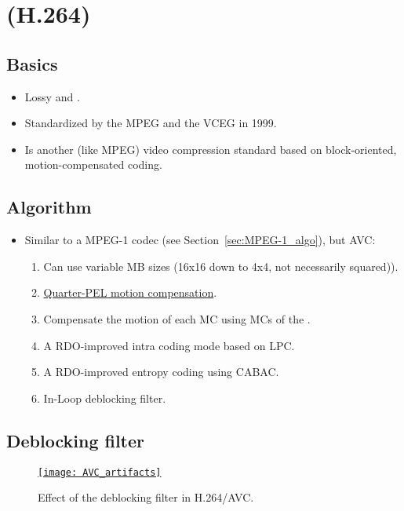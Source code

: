 \chapter{ (H.264)}

\section{Basics}
\begin{itemize}
\item Lossy and  \cite{wikipedia_AVC}.
\item Standardized by the \gls{MPEG} and the \gls{VCEG} in 1999.
\item Is another (like \gls{MPEG}) video compression standard based on
  block-oriented, motion-compensated coding.
\end{itemize}

\section{Algorithm}
\label{sec:MPEG-4_AVC_algo}
\begin{itemize}
\item Similar to a MPEG-1 codec (see Section~\ref{sec:MPEG-1_algo}),
  but \gls{AVC}:
\begin{enumerate}
\item Can use variable MB sizes (16x16 down to 4x4, not
  necessarily squared)).
\item
  \href{https://en.wikipedia.org/wiki/Motion_compensation}{Quarter-\gls{PEL}
    motion compensation}.
\item Compensate the motion of each MC using MCs of the
  .
\item A \gls{RDO}-improved intra coding mode based on \gls{LPC}.
\item A \gls{RDO}-improved entropy coding using \gls{CABAC}.
\item In-Loop deblocking filter.
\end{enumerate}
\end{itemize}

\section{Deblocking filter}

\begin{figure}[H]
  \vspace{-2ex}
  \centering
  \href{https://www.sciencedirect.com/science/article/pii/B9780124157606000167}{\texttt{[image: AVC\_artifacts]}}
  \caption{Effect of the deblocking filter in H.264/\gls{AVC}.}
  \label{fig:H264_deblocking}
\end{figure}
